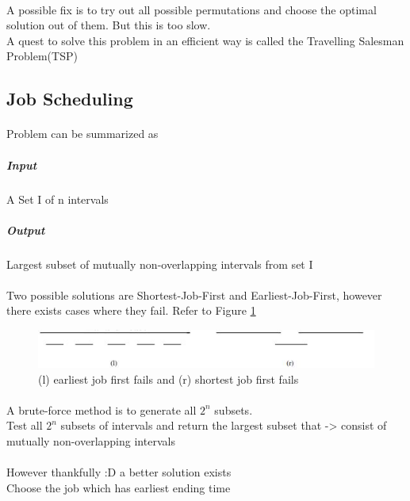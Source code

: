 \documentclass{article}
\begin{document}
\paragraph{}
A possible fix is to try out all possible permutations and choose the optimal solution out of them.
But this is too slow.
\\
A quest to solve this problem in an efficient way is called the Travelling Salesman Problem(TSP)

\subsection{Job Scheduling}
\paragraph{}
Problem can be summarized as
\subparagraph{Input}
A Set I of n intervals
\subparagraph{Output}
Largest subset of mutually non-overlapping intervals from set I

\paragraph{}
Two possible solutions are Shortest-Job-First and Earliest-Job-First, however there exists cases
where they fail.
Refer to Figure \ref{fig:EJF_SJF_heurestic_fail}

\begin{figure}[h]
    \centering
    \includegraphics[width=\linewidth]{./images/job_scheduling.JPG}
    \caption{(l) earliest job first fails and (r) shortest job first fails}
    \label{fig:EJF_SJF_heurestic_fail}
\end{figure}

\paragraph{}
A brute-force method is to generate all $2^n$ subsets.
\\
Test all $2^n$ subsets of intervals and 
return the largest subset that -> consist of mutually non-overlapping intervals

\paragraph{}
However thankfully :D a better solution exists
\\
Choose the job which has earliest ending time
\end{document}
